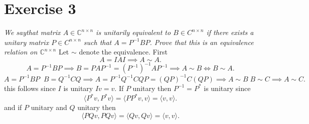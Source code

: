 \documentclass{article}
\begin{document}
    \section{Exercise 3}
    \emph{
        We saythat matrix $A \in \mathbb{C}^{n \times n}$ is unitarily equivalent to $B \in C^{n \times n}$ if
        there exists a unitary matrix $P \in C^{n \times n}$ such that $A = P^{-1}BP$. Prove that this is an equivalence relation
        on $ \mathbb{C}^{n \times n}$
    }
    Let $\sim$ denote the equivalence.
    First
    \[
    A = IAI \implies A \sim A 
    .\] 
    \[
    A = P^{-1}BP \implies B = PAP^{-1} = (P^{-1})^{-1}AP^{-1} \implies A \sim B \iff B \sim A
    .\] 
    \[
    A = P^{-1}BP \;\; B = Q^{-1}CQ \implies A = P^{-1}Q^{-1}CQP = (QP)^{-1}C(QP) \implies A \sim B \; B \sim C \implies A \sim C
    .\] 
    this follows since $I$ is unitary $Iv = v$. If $P$ unitary then $P^{-1} = P^{*}$ is unitary since 
    \[
    \langle P^{*}v, P^{*}v \rangle = \langle PP^{*}v, v \rangle = \langle v, v \rangle
    .\] 
    and if $P$ unitary and $Q$ unitary then
    \[
    \langle PQv, PQv \rangle = \langle Qv, Qv \rangle = \langle v, v \rangle
    .\] 
\end{document}
